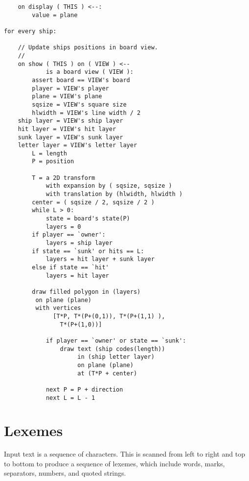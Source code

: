 \documentclass[12pt]{article}
\begin{document}
\begin{verbatim}
    on display ( THIS ) <--:
        value = plane

for every ship:

    // Update ships positions in board view.
    //
    on show ( THIS ) on ( VIEW ) <--
            is a board view ( VIEW ):
        assert board == VIEW's board
        player = VIEW's player
        plane = VIEW's plane
        sqsize = VIEW's square size
        hlwidth = VIEW's line width / 2
	ship layer = VIEW's ship layer
	hit layer = VIEW's hit layer
	sunk layer = VIEW's sunk layer
	letter layer = VIEW's letter layer
        L = length
        P = position

        T = a 2D transform
            with expansion by ( sqsize, sqsize )
            with translation by (hlwidth, hlwidth )
        center = ( sqsize / 2, sqsize / 2 )
        while L > 0:
            state = board's state(P)
            layers = 0
	    if player == `owner':
	        layers = ship layer
	    if state == `sunk' or hits == L:
	        layers = hit layer + sunk layer
	    else if state == `hit'
	        layers = hit layer
	        
	    draw filled polygon in (layers)
		 on plane (plane)
		 with vertices
		      [T*P, T*(P+(0,1)), T*(P+(1,1) ),
			    T*(P+(1,0))]

            if player == `owner' or state == `sunk':
                draw text (ship codes(length))
                     in (ship letter layer)
                     on plane (plane)
                     at (T*P + center)

            next P = P + direction
            next L = L - 1
\end{verbatim}


\newpage

\section{Lexemes}

Input text is a sequence of characters.  This is scanned from
left to right and top to bottom to produce a sequence of lexemes,
which include words, marks, separators, numbers, and quoted strings.
\end{document}
